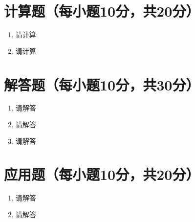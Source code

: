 \documentclass[oneside,AutoFakeBold=2.85]{cjluexam}
\begin{document}
\section{计算题（每小题10分，共20分）}

\begin{enumerate}
  \item
    请计算
    \vspace{8cm}
  \item
    请计算
\end{enumerate}

\clearpage

\section{解答题（每小题10分，共30分）}

\begin{enumerate}
  \item
    请解答
    \vfill
  \item
    请解答
    \vfill
  \item
    请解答
    \vfill
\end{enumerate}

\clearpage

\section{应用题（每小题10分，共20分）}

\begin{enumerate}
  \item
    请解答
    \vfill
  \item
    请解答
    \vfill
\end{enumerate}
\end{document}
